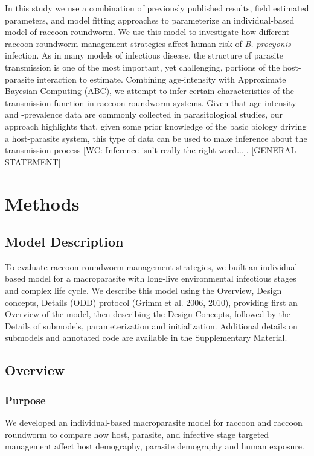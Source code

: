 \documentclass[11pt]{article}
\begin{document}
In this study we use a combination of previously published results, field estimated parameters, and model fitting approaches to parameterize an individual-based model of raccoon roundworm.  We use this model to investigate how different raccoon roundworm management strategies affect human risk of \emph{B. procyonis} infection. As in many models of infectious disease, the structure of parasite transmission is one of the most important, yet challenging, portions of the host-parasite interaction to estimate.  Combining age-intensity with Approximate Bayesian Computing (ABC), we attempt to infer certain characteristics of the transmission function in raccoon roundworm systems.  Given that age-intensity and -prevalence data are commonly collected in parasitological studies, our approach highlights that, given some prior knowledge of the basic biology driving a host-parasite system, this type of data can be used to make inference about the transmission process [WC: Inference isn't really the right word...]. [GENERAL STATEMENT]

\section{Methods}

\subsection{Model Description}

To evaluate raccoon roundworm management strategies, we built an
individual-based model for a macroparasite with long-live
environmental infectious stages and complex life cycle. We describe this
model using the Overview, Design concepts, Details (ODD) protocol (Grimm
et al. 2006, 2010), providing first an Overview of the model, then
describing the Design Concepts, followed by the Details of submodels,
parameterization and initialization. Additional details on submodels and
annotated code are available in the Supplementary Material.

\subsection{Overview}

\subsubsection{Purpose}

We developed an individual-based macroparasite model for raccoon and
raccoon roundworm to compare how host, parasite, and infective stage
targeted management affect host demography, parasite demography and
human exposure.
\end{document}
